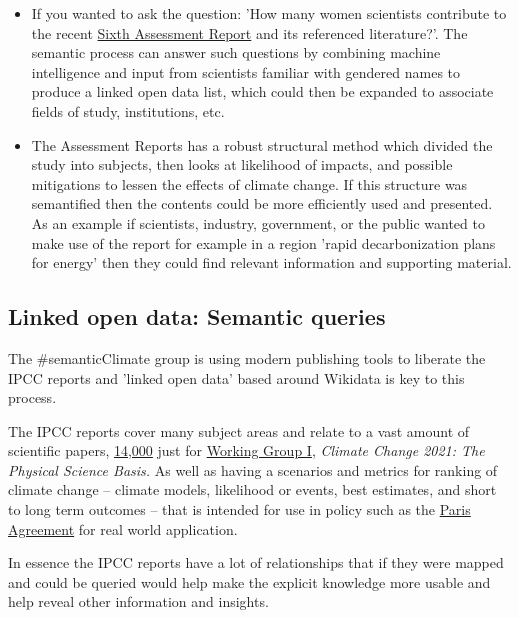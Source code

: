 \documentclass{article}
\begin{document}
\begin{itemize}
\item If you wanted to ask the question: 'How many women scientists contribute to the recent \href{https://en.wikipedia.org/wiki/IPCC_Sixth_Assessment_Report}{Sixth Assessment Report} and its referenced literature?'. The semantic process can answer such questions by combining machine intelligence and input from scientists familiar with gendered names to produce a linked open data list, which could then be  expanded to associate fields of study, institutions, etc.


\item The Assessment Reports has a robust structural method which divided the study into subjects, then looks at likelihood of impacts, and possible mitigations to lessen the effects of climate change. If this structure was semantified then the contents could be more efficiently used and presented. As an example if scientists, industry, government, or the public wanted to make use of the report for example in a region 'rapid decarbonization plans for energy' then they could find relevant information and supporting material.


\end{itemize}

\subsection{Linked open data: Semantic queries}\label{H2912725}



The \#semanticClimate group is using modern publishing tools to liberate the IPCC reports and 'linked open data' based around Wikidata is key to this process. 


The IPCC reports cover many subject areas and relate to a vast amount of scientific papers, \href{https://en.wikipedia.org/wiki/IPCC_Sixth_Assessment_Report}{14,000} just for \href{https://www.ipcc.ch/report/sixth-assessment-report-working-group-i/}{Working Group I}, \emph{Climate Change 2021: The Physical Science Basis.} As well as having a scenarios and metrics for ranking of climate change – climate models, likelihood or events, best estimates, and short to long term outcomes – that is intended for use in policy such as the \href{https://www.un.org/en/climatechange/paris-agreement}{Paris Agreement} for real world application. 


In essence the IPCC reports have a lot of relationships that if they were mapped and could be queried would help make the explicit knowledge more usable and help reveal other information and insights.
\end{document}
